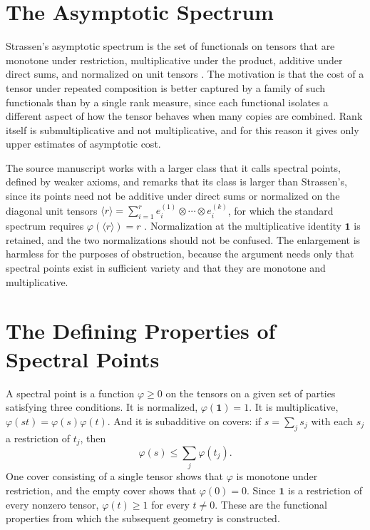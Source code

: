 \documentclass[11pt,letterpaper]{report}
\theoremstyle{plain}
\theoremstyle{definition}
\theoremstyle{remark}
\begin{document}
\section{The Asymptotic Spectrum}

Strassen's asymptotic spectrum is the set of functionals on tensors that are monotone under restriction, multiplicative under the product, additive under direct sums, and normalized on unit tensors \cite{Strassen1988}. The motivation is that the cost of a tensor under repeated composition is better captured by a family of such functionals than by a single rank measure, since each functional isolates a different aspect of how the tensor behaves when many copies are combined. Rank itself is submultiplicative and not multiplicative, and for this reason it gives only upper estimates of asymptotic cost.

The source manuscript works with a larger class that it calls spectral points, defined by weaker axioms, and remarks that its class is larger than Strassen's, since its points need not be additive under direct sums or normalized on the diagonal unit tensors $\langle r\rangle=\sum_{i=1}^{r}e_i^{(1)}\otimes\cdots\otimes e_i^{(k)}$, for which the standard spectrum requires $\varphi(\langle r\rangle)=r$ \cite{Source2026}. Normalization at the multiplicative identity $\mathbf 1$ is retained, and the two normalizations should not be confused. The enlargement is harmless for the purposes of obstruction, because the argument needs only that spectral points exist in sufficient variety and that they are monotone and multiplicative.

\section{The Defining Properties of Spectral Points}

A spectral point is a function $\varphi\ge0$ on the tensors on a given set of parties satisfying three conditions. It is normalized, $\varphi(\mathbf 1)=1$. It is multiplicative, $\varphi(st)=\varphi(s)\varphi(t)$. And it is subadditive on covers: if $s=\sum_{j}s_j$ with each $s_j$ a restriction of $t_j$, then
\[
\varphi(s)\le\sum_j\varphi(t_j).
\]
One cover consisting of a single tensor shows that $\varphi$ is monotone under restriction, and the empty cover shows that $\varphi(0)=0$. Since $\mathbf 1$ is a restriction of every nonzero tensor, $\varphi(t)\ge1$ for every $t\ne0$. These are the functional properties from which the subsequent geometry is constructed.
\end{document}
